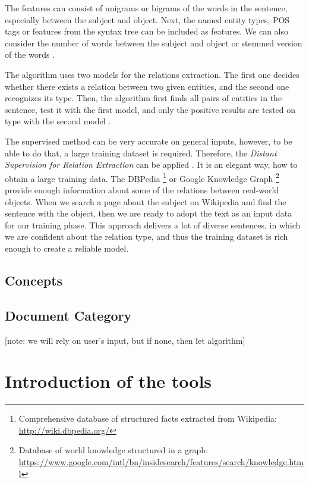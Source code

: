\documentclass[
  digital, %
  table,   %
  lof,     %
  lot,     %
]{fithesis3}
\begin{document}
The features can consist of unigrams or bigrams of the words in the sentence, especially between the subject and object. Next, the named entity types, POS tags or features from the syntax tree can be included as features. We can also consider the number of words between the subject and object or stemmed version of the words \cite[sec. 21.2]{jurafsky2014speech}.

The algorithm uses two models for the relations extraction.
The first one decides whether there exists a relation between two given entities, and the second one recognizes its type. Then, the algorithm first finds all pairs of entities in the sentence, test it with the first model, and only the positive results are tested on type with the second model \cite[sec. 21.2]{jurafsky2014speech}.

The supervised method can be very accurate on general inputs, however, to be able to do that, a large training dataset is required.
Therefore, the \textit{Distant Supervision for Relation Extraction} can be applied \cite{mintz2009distant}.
It is an elegant way, how to obtain a large training data.
The DBPedia \footnote{Comprehensive database of structured facts extracted from Wikipedia: \mbox{\url{http://wiki.dbpedia.org/}}} or 
Google Knowledge Graph \footnote{Database of world knowledge structured in a graph: \url{https://www.google.com/intl/bn/insidesearch/features/search/knowledge.html}}
provide enough information about some of the relations between real-world objects.
When we search a page about the subject on Wikipedia and find the sentence with the object, then we are ready to adopt the text as an input data for our training phase.
This approach delivers a lot of diverse sentences, in which we are confident about the relation type, and thus the training dataset is rich enough to create a reliable model.

\subsection{Concepts}



\subsection{Document Category}
[note: we will rely on user's input, but if none, then let algorithm]


\section{Introduction of the tools}
\end{document}
